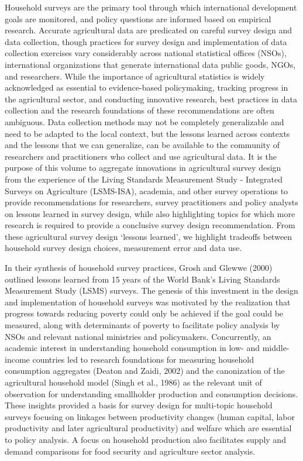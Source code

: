 \documentclass[
]{book}
\begin{document}
Household surveys are the primary tool through which international development goals are monitored, and policy questions are informed based on empirical research. Accurate agricultural data are predicated on careful survey design and data collection, though practices for survey design and implementation of data collection exercises vary considerably across national statistical offices (NSOs), international organizations that generate international data public goods, NGOs, and researchers. While the importance of agricultural statistics is widely acknowledged as essential to evidence-based policymaking, tracking progress in the agricultural sector, and conducting innovative research, best practices in data collection and the research foundations of these recommendations are often ambiguous. Data collection methods may not be completely generalizable and need to be adapted to the local context, but the lessons learned across contexts and the lessons that we can generalize, can be available to the community of researchers and practitioners who collect and use agricultural data. It is the purpose of this volume to aggregate innovations in agricultural survey design from the experience of the Living Standards Measurement Study - Integrated Surveys on Agriculture (LSMS-ISA), academia, and other survey operations to provide recommendations for researchers, survey practitioners and policy analysts on lessons learned in survey design, while also highlighting topics for which more research is required to provide a conclusive survey design recommendation. From these agricultural survey design `lessons learned', we highlight tradeoffs between household survey design choices, measurement error and data use.

In their synthesis of household survey practices, Grosh and Glewwe (2000) outlined lessons learned from 15 years of the World Bank's Living Standards Measurement Study (LSMS) surveys. The genesis of this investment in the design and implementation of household surveys was motivated by the realization that progress towards reducing poverty could only be achieved if the goal could be measured, along with determinants of poverty to facilitate policy analysis by NSOs and relevant national ministries and policymakers. Concurrently, an academic interest in understanding household consumption in low- and middle-income countries led to research foundations for measuring household consumption aggregates (Deaton and Zaidi, 2002) and the canonization of the agricultural household model (Singh et al., 1986) as the relevant unit of observation for understanding smallholder production and consumption decisions. These insights provided a basis for survey design for multi-topic household surveys focusing on linkages between productivity changes (human capital, labor productivity and later agricultural productivity) and welfare which are essential to policy analysis. A focus on household production also facilitates supply and demand comparisons for food security and agriculture sector analysis.
\end{document}
